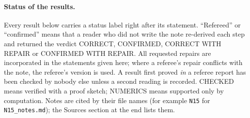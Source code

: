 \documentclass[11pt]{article}
\theoremstyle{definition}
\theoremstyle{remark}
\newcommand{\src}[1]{\texttt{#1}}
\begin{document}
\paragraph{Status of the results.}
Every result below carries a status label right after its statement. ``Refereed'' or ``confirmed'' means that a reader who did not write the note re-derived each step and returned the verdict CORRECT, CONFIRMED, CORRECT WITH REPAIR or CONFIRMED WITH REPAIR. All requested repairs are incorporated in the statements given here; where a referee's repair conflicts with the note, the referee's version is used. A result first proved \emph{in} a referee report has been checked by nobody else unless a second reading is recorded. CHECKED means verified with a proof sketch; NUMERICS means supported only by computation. Notes are cited by their file names (for example \src{N15} for \src{N15\_notes.md}); the Sources section at the end lists them.
\end{document}
